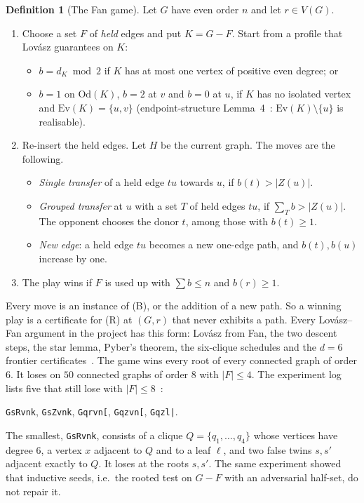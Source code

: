 \documentclass[11pt]{amsart}
\theoremstyle{definition}
\newtheorem{definition}[theorem]{Definition}
\newcommand{\Ev}{\mathrm{Ev}}
\newcommand{\Od}{\mathrm{Od}}
\begin{document}
\begin{definition}[The Fan game]\label{def:game}
Let $G$ have even order $n$ and let $r\in V(G)$.
\begin{enumerate}
\item Choose a set $F$ of \emph{held} edges and put $K=G-F$. Start from a profile that Lov\'asz
guarantees on $K$:
\begin{itemize}
\item $b=d_K\bmod 2$ if $K$ has at most one vertex of positive even degree; or
\item $b=1$ on $\Od(K)$, $b=2$ at $v$ and $b=0$ at $u$, if $K$ has no isolated vertex and
$\Ev(K)=\{u,v\}$ (endpoint-structure Lemma~4~\cite{ES}: $\Ev(K)\setminus\{u\}$ is realisable).
\end{itemize}
\item Re-insert the held edges. Let $H$ be the current graph. The moves are the following.
\begin{itemize}
\item \emph{Single transfer} of a held edge $tu$ towards $u$, if $b(t)>|Z(u)|$.
\item \emph{Grouped transfer} at $u$ with a set $T$ of held edges $tu$, if
$\sum_Tb>|Z(u)|$. The opponent chooses the donor $t$, among those with $b(t)\ge1$.
\item \emph{New edge}: a held edge $tu$ becomes a new one-edge path, and $b(t),b(u)$ increase by one.
\end{itemize}
\item The play wins if $F$ is used up with $\sum b\le n$ and $b(r)\ge1$.
\end{enumerate}
\end{definition}
Every move is an instance of (B), or the addition of a new path. So a winning play is a certificate
for (R) at $(G,r)$ that never exhibits a path. Every Lov\'asz--Fan argument in the project has
this form: Lov\'asz from Fan, the two descent steps, the star lemma, Pyber's theorem, the
six-clique schedules and the $d=6$ frontier certificates~\cite{ES,D6}. The game wins every root
of every connected graph of order $6$. It loses on $50$ connected graphs of order $8$ with
$|F|\le4$. The experiment log lists five that still lose with $|F|\le 8$~\cite[E13]{EXP}:
\begin{center}
\texttt{GsRvnk}, \texttt{GsZvnk}, \texttt{Gqrvn[}, \texttt{Gqzvn[}, \texttt{Gqzl|}.
\end{center}
The smallest, \texttt{GsRvnk}, consists of a clique $Q=\{q_1,\dots,q_4\}$ whose vertices have
degree $6$, a vertex $x$ adjacent to $Q$ and to a leaf $\ell$, and two false twins $s,s'$
adjacent exactly to $Q$. It loses at the roots $s,s'$. The same experiment showed that inductive
seeds, i.e.\ the rooted test on $G-F$ with an adversarial half-set, do not repair it.
\end{document}
